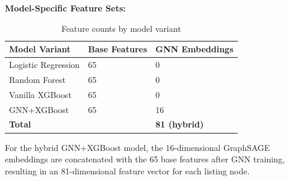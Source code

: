 \textbf{Model-Specific Feature Sets:}

\begin{table}[h]
\centering
\caption{Feature counts by model variant}
\begin{tabular}{lll}
\hline
\textbf{Model Variant} & \textbf{Base Features} & \textbf{GNN Embeddings} \\
\hline
Logistic Regression & 65 & 0 \\
Random Forest & 65 & 0 \\
Vanilla XGBoost & 65 & 0 \\
GNN+XGBoost & 65 & 16 \\
\hline
\textbf{Total} & & \textbf{81 (hybrid)} \\
\hline
\end{tabular}
\end{table}

For the hybrid GNN+XGBoost model, the 16-dimensional GraphSAGE embeddings are concatenated with the 65 base features after GNN training, resulting in an 81-dimensional feature vector for each listing node.
